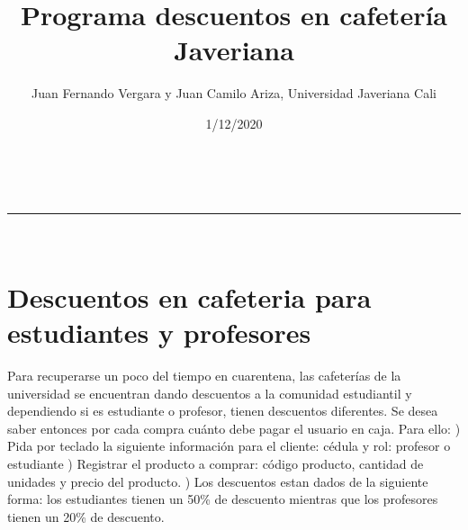 \documentclass[a4paper,11pt]{article}
\makeatletter
\newcommand{\linia}{\rule{\linewidth}{0.5pt}}
\theoremstyle{mytheor}
\renewcommand{\maketitle}{
\begin{center}
\vspace{2ex}
{\huge \textsc{\@title}}
\vspace{1ex}
\\
\linia\\
\@author \hfill \@date
\vspace{4ex}
\end{center}
}
\makeatother
\begin{document}
\title{Programa descuentos en cafetería Javeriana}

\author{Juan Fernando Vergara y Juan Camilo Ariza, Universidad Javeriana Cali}


\date{1/12/2020}

\maketitle

\section*{Descuentos en cafeteria para estudiantes y profesores}

Para recuperarse un poco del tiempo en cuarentena, las cafeterías de la universidad se encuentran dando descuentos a la comunidad estudiantil y dependiendo si es estudiante o profesor,
tienen descuentos diferentes. Se desea saber entonces por cada compra cuánto debe pagar el usuario en caja. Para ello:
) Pida por teclado la siguiente información para el cliente: cédula y rol: profesor o estudiante
) Registrar el producto a comprar: código producto, cantidad de unidades y precio del producto.
) Los descuentos estan dados de la siguiente forma: los estudiantes tienen un 50\% de descuento mientras que los profesores tienen un 20\% de descuento.
\end{document}
